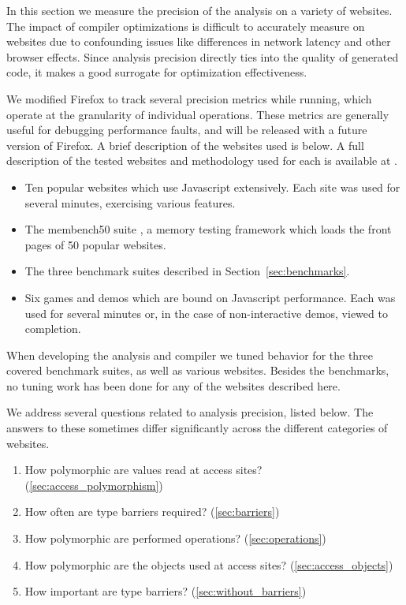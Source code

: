 In this section we measure the precision of the analysis
on a variety of websites.
The impact of compiler optimizations is difficult to accurately
measure on websites due to confounding issues like differences
in network latency and other browser effects.
Since analysis precision directly ties into the quality of
generated code, it makes a good surrogate for optimization effectiveness.

We modified Firefox to track several precision metrics while running,
which operate at the granularity of individual operations.
These metrics are generally useful for debugging performance faults,
and will be released with a future version of Firefox.
A brief description of the websites used is below.
A full description of the tested websites and methodology used for each
is available at \cite{XXX}.

\begin{itemize}

\item Ten popular websites which use Javascript extensively.
Each site was used for several minutes, exercising various features.

\item The membench50 suite \cite{XXX}, a memory testing framework
which loads the front pages of 50 popular websites.

\item The three benchmark suites described in Section~\ref{sec:benchmarks}.

\item Six games and demos which are bound on Javascript performance.
Each was used for several minutes or, in the case of non-interactive
demos, viewed to completion.

\end{itemize}

When developing the analysis and compiler we tuned behavior for the three
covered benchmark suites, as well as various websites.
Besides the benchmarks, no tuning work has been done for any of the
websites described here.

We address several questions related to analysis precision,
listed below. The answers to these sometimes differ significantly
across the different categories of websites.

\begin{enumerate}

\item How polymorphic are values read at access sites?  (\ref{sec:access_polymorphism})

\item How often are type barriers required?  (\ref{sec:barriers})

\item How polymorphic are performed operations?  (\ref{sec:operations})

\item How polymorphic are the objects used at access sites?  (\ref{sec:access_objects})

\item How important are type barriers?  (\ref{sec:without_barriers})

\end{enumerate}

